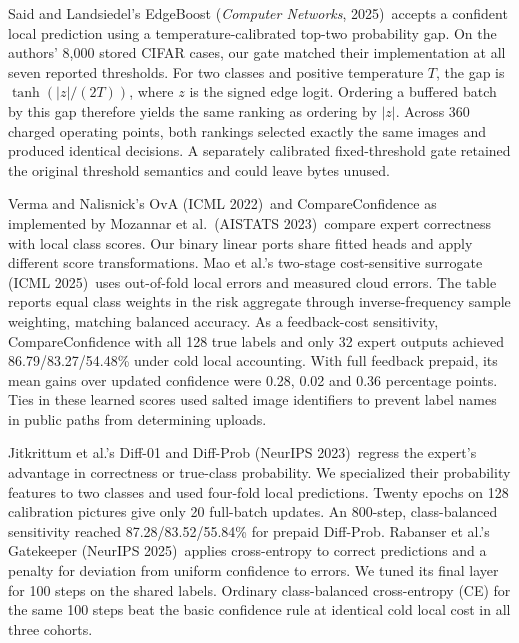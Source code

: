 Said and Landsiedel's EdgeBoost (\emph{Computer Networks}, 2025)\,\cite{edgeboost} accepts a confident local prediction using a temperature-calibrated top-two probability gap. On the authors' 8,000 stored CIFAR cases, our gate matched their implementation at all seven reported thresholds. For two classes and positive temperature $T$, the gap is $\tanh(|z|/(2T))$, where $z$ is the signed edge logit. Ordering a buffered batch by this gap therefore yields the same ranking as ordering by $|z|$. Across 360 charged operating points, both rankings selected exactly the same images and produced identical decisions. A separately calibrated fixed-threshold gate retained the original threshold semantics and could leave bytes unused.

Verma and Nalisnick's OvA (ICML 2022)\,\cite{ova} and CompareConfidence as implemented by Mozannar et al.\ (AISTATS 2023)\,\cite{cc} compare expert correctness with local class scores. Our binary linear ports share fitted heads and apply different score transformations. Mao et al.'s two-stage cost-sensitive surrogate (ICML 2025)\,\cite{mao} uses out-of-fold local errors and measured cloud errors. The table reports equal class weights in the risk aggregate through inverse-frequency sample weighting, matching balanced accuracy. As a feedback-cost sensitivity, CompareConfidence with all 128 true labels and only 32 expert outputs achieved 86.79/83.27/54.48\% under cold local accounting. With full feedback prepaid, its mean gains over updated confidence were 0.28, 0.02 and 0.36 percentage points. Ties in these learned scores used salted image identifiers to prevent label names in public paths from determining uploads.

Jitkrittum et al.'s Diff-01 and Diff-Prob (NeurIPS 2023)\,\cite{jit} regress the expert's advantage in correctness or true-class probability. We specialized their probability features to two classes and used four-fold local predictions. Twenty epochs on 128 calibration pictures give only 20 full-batch updates. An 800-step, class-balanced sensitivity reached 87.28/83.52/55.84\% for prepaid Diff-Prob. Rabanser et al.'s Gatekeeper (NeurIPS 2025)\,\cite{gate} applies cross-entropy to correct predictions and a penalty for deviation from uniform confidence to errors. We tuned its final layer for 100 steps on the shared labels. Ordinary class-balanced cross-entropy (CE) for the same 100 steps beat the basic confidence rule at identical cold local cost in all three cohorts.

